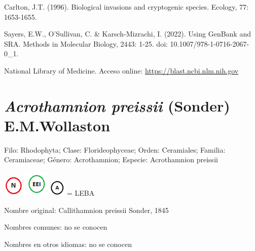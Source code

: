 \documentclass{article}
\begin{document}
\begin{thebibliography}{18}
Carlton, J.T. (1996). Biological invasions and cryptogenic species. Ecology, 77: 1653-1655.

Sayers, E.W., O'Sullivan, C. \& Karsch-Mizrachi, I. (2022). Using GenBank and SRA. Methods in Molecular Biology, 2443: 1-25. doi: 10.1007/978-1-0716-2067-0\_1.  

National Library of Medicine. Acceso online: \url{https://blast.ncbi.nlm.nih.gov}
\end{thebibliography}
\clearpage

\section{\textit{Acrothamnion preissii} (Sonder) E.M.Wollaston \cite{acro1}}

{\color{olive}Filo}: Rhodophyta; {\color{olive}Clase}: Florideophyceae; 
{\color{olive}Orden}: Ceramiales; {\color{olive}Familia}: Ceramiaceae; 
{\color{olive}Género}: Acrothamnion; {\color{olive}Especie}: Acrothamnion preissii
\par
\includegraphics{./images/N.png}
\includegraphics{./images/EEI.png}
\includegraphics{./images/a.png}
= LEBA		
\par

{\color{olive}Nombre original}: Callithamnion preissii Sonder, 1845
\par 
{\color{olive}Nombres comunes}: no se conocen
\par
{\color{olive}Nombres en otros idiomas}: no se conocen
\end{document}
